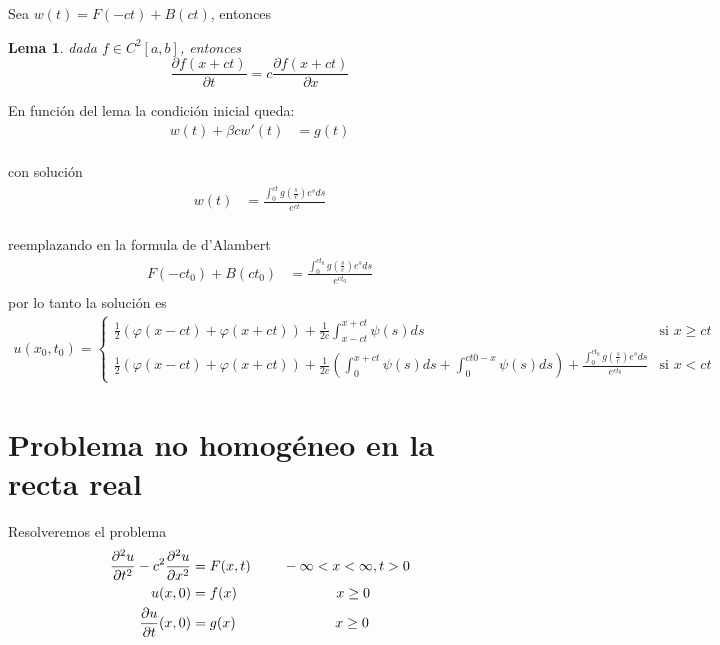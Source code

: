 \documentclass[11pt]{book}
\theoremstyle{plain}
\newtheorem{lema}[proposición]{Lema}
\theoremstyle{definition}
\begin{document}
Sea $w(t) = F(-ct) + B(ct)$, entonces

\begin{lema}
    dada $f\in C^{2}[a,b]$, entonces
    $$\frac{\partial f(x+ct)}{\partial t} = c\frac{\partial f(x+ct)}{\partial x}$$
\end{lema}

En función del lema la condición inicial queda:
\begin{align*}
    w(t) + \beta cw'(t) &= g(t)\\
\end{align*}

con solución
\begin{align*}
    w(t) &= \frac{\int_{0}^{ct}g(\frac{s}{c})e^{s}ds}{e^{ct}}\\
\end{align*}

reemplazando en la formula de d'Alambert
\begin{align*}
    F(-ct_0) + B(ct_0) &= \frac{\int_{0}^{ct_0}g(\frac{s}{c})e^{s}ds}{e^{ct_0}}\\
\end{align*}
por lo tanto la solución es
\begin{align}
    u(x_0,t_0)=
    \begin{cases} 
    \frac{1}{2}\left(\varphi(x-ct)+\varphi(x+ct)\right)
        +\frac{1}{2c}\int_{x-ct}^{x+ct}\psi(s)ds & \text{si }  x\geq ct\\
     \frac{1}{2}\left( \varphi(x - ct) + \varphi(x + ct)\right) + \frac{1}{2c}\left( \int_{0}^{x+ct}\psi(s)ds+ \int_{0}^{ct0-x}\psi(s)ds\right) + \frac{\int_{0}^{ct_0}g(\frac{s}{c})e^{s}ds}{e^{ct_0}} & \text{si } x<ct
    \end{cases}
\end{align}


\newpage
\section{Problema no homogéneo en la recta real}
Resolveremos el problema
\setcounter{equation}{0}
\begin{align}
    \frac{\partial^2 u}{\partial t^2} - c^2 \frac{\partial^2 u}{\partial x^2}&= F(x,t) \hspace{8mm} -\infty<x<\infty, t > 0\\ 
    u(x,0)&= f(x) \hspace{25mm} x \geq 0\\
    \frac{\partial u}{\partial t}(x,0) &= g(x) \hspace{25mm} x \geq 0
\end{align}
\end{document}

